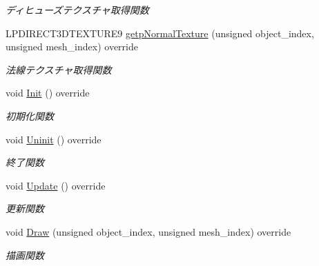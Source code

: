 \begin{DoxyCompactItemize}
\begin{DoxyCompactList}\small\item\em ディヒューズテクスチャ取得関数 \end{DoxyCompactList}\item 
L\+P\+D\+I\+R\+E\+C\+T3\+D\+T\+E\+X\+T\+U\+R\+E9 \mbox{\hyperlink{class_player_draw_a231aa618a0bf71311b61897ccf7191b8}{getp\+Normal\+Texture}} (unsigned object\+\_\+index, unsigned mesh\+\_\+index) override
\begin{DoxyCompactList}\small\item\em 法線テクスチャ取得関数 \end{DoxyCompactList}\item 
void \mbox{\hyperlink{class_player_draw_ad79a0fbeb618e0913822b573e5d0be68}{Init}} () override
\begin{DoxyCompactList}\small\item\em 初期化関数 \end{DoxyCompactList}\item 
void \mbox{\hyperlink{class_player_draw_a917b2947914287f23d87ca75cd68f553}{Uninit}} () override
\begin{DoxyCompactList}\small\item\em 終了関数 \end{DoxyCompactList}\item 
void \mbox{\hyperlink{class_player_draw_aa16d0fb9345c08df3b3a626128707cf7}{Update}} () override
\begin{DoxyCompactList}\small\item\em 更新関数 \end{DoxyCompactList}\item 
void \mbox{\hyperlink{class_player_draw_a8b9e8caa6bea7295f58a0aaddeb9458b}{Draw}} (unsigned object\+\_\+index, unsigned mesh\+\_\+index) override
\begin{DoxyCompactList}\small\item\em 描画関数 \end{DoxyCompactList}\end{DoxyCompactItemize}
